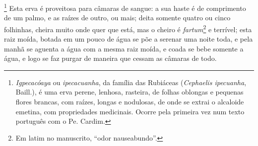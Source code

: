 \footnote{ \textit{Igpecacóaya} ou \textit{
ipecacuanha}, da família das Rubiáceas (\textit{Cephaelis ipecuanha}, Baill.),
é uma erva perene, lenhosa, rasteira, de
folhas oblongas e pequenas flores brancas, com raízes, longas e
nodulosas, de onde se extrai o alcaloide emetina, com propriedades
medicinais. Ocorre pela primeira vez num texto português com o Pe.
Cardim.} Esta erva é proveitosa para câmaras de sangue: a
sua haste é de comprimento de um palmo, e as raízes de outro, ou mais;
deita somente quatro ou cinco folhinhas, cheira muito onde quer que
está, mas o cheiro é \textit{fartum}\footnote{ Em latim no manuscrito, ``odor nauseabundo''.} e
terrível; esta raiz moída, botada em um pouco de água se põe a serenar
uma noite toda, e pela manhã se aguenta a água com a mesma raiz moída,
e coada se bebe somente a água, e logo se faz purgar de maneira que
cessam as câmaras de todo.

